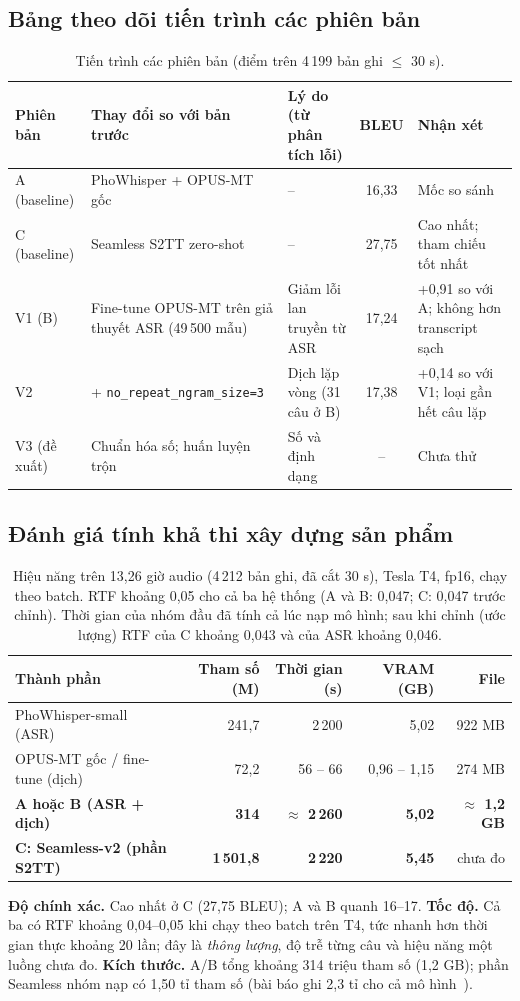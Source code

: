 \documentclass[12pt,a4paper]{article}
\begin{document}
\subsection{Bảng theo dõi tiến trình các phiên bản}
\begin{table}[H]\centering\small
\begin{tabularx}{\textwidth}{>{\raggedright\arraybackslash}p{1.4cm}YYcY}\toprule
Phiên bản & Thay đổi so với bản trước & Lý do (từ phân tích lỗi) & BLEU & Nhận xét\\\midrule
A (baseline) & PhoWhisper + OPUS-MT gốc & -- & 16,33 & Mốc so sánh\\
C (baseline) & Seamless S2TT zero-shot & -- & 27,75 & Cao nhất; tham chiếu tốt nhất\\
V1 (B) & Fine-tune OPUS-MT trên giả thuyết ASR (49\,500 mẫu) & Giảm lỗi lan truyền từ ASR & 17,24 & +0,91 so với A; không hơn transcript sạch\\
V2 & + \texttt{no\_repeat\_ngram\_size=3} & Dịch lặp vòng (31 câu ở B) & 17,38 & +0,14 so với V1; loại gần hết câu lặp\\
V3 (đề xuất) & Chuẩn hóa số; huấn luyện trộn & Số và định dạng & -- & Chưa thử\\\bottomrule
\end{tabularx}
\caption{Tiến trình các phiên bản (điểm trên 4\,199 bản ghi $\le$ 30 s).}
\end{table}

\subsection{Đánh giá tính khả thi xây dựng sản phẩm}
\begin{table}[H]\centering\small
\begin{tabular}{lrrrr}\toprule
Thành phần & Tham số (M) & Thời gian (s) & VRAM (GB) & File\\\midrule
PhoWhisper-small (ASR) & 241,7 & 2\,200 & 5,02 & 922 MB\\
OPUS-MT gốc / fine-tune (dịch) & 72,2 & 56 -- 66 & 0,96 -- 1,15 & 274 MB\\
\textbf{A hoặc B (ASR + dịch)} & \textbf{314} & \textbf{$\approx$ 2\,260} & \textbf{5,02} & \textbf{$\approx$ 1,2 GB}\\
\textbf{C: Seamless-v2 (phần S2TT)} & \textbf{1\,501,8} & \textbf{2\,220} & \textbf{5,45} & chưa đo\\\bottomrule
\end{tabular}
\caption{Hiệu năng trên 13,26 giờ audio (4\,212 bản ghi, đã cắt 30 s), Tesla T4, fp16, chạy theo batch. RTF khoảng 0,05 cho cả ba hệ thống (A và B: 0,047; C: 0,047 trước chỉnh). Thời gian của nhóm đầu đã tính cả lúc nạp mô hình; sau khi chỉnh (ước lượng) RTF của C khoảng 0,043 và của ASR khoảng 0,046.}
\end{table}
\textbf{Độ chính xác.} Cao nhất ở C (27,75 BLEU); A và B quanh 16--17. \textbf{Tốc độ.} Cả ba có RTF khoảng 0,04--0,05 khi chạy theo batch trên T4, tức nhanh hơn thời gian thực khoảng 20 lần; đây là \emph{thông lượng}, độ trễ từng câu và hiệu năng một luồng chưa đo. \textbf{Kích thước.} A/B tổng khoảng 314 triệu tham số (1,2 GB); phần Seamless nhóm nạp có 1,50 tỉ tham số (bài báo ghi 2,3 tỉ cho cả mô hình~\cite{seamless}).
\end{document}
